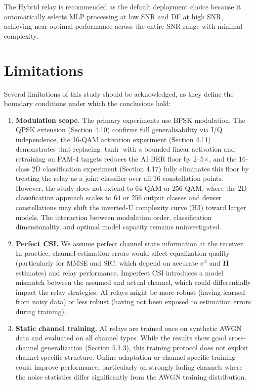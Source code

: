 \documentclass[
  english,
  12pt,
  12pt,
  a4paper,
  oneside]{report}
\begin{document}
The Hybrid relay is recommended as the default deployment choice because it automatically selects MLP processing at low SNR and DF at high SNR, achieving near-optimal performance across the entire SNR range with minimal complexity.

\section{Limitations}\label{sec:limitations}

Several limitations of this study should be acknowledged, as they define the boundary conditions under which the conclusions hold:

\begin{enumerate}
\def\labelenumi{\arabic{enumi}.}
\item
  \textbf{Modulation scope.} The primary experiments use BPSK modulation. The QPSK extension (Section 4.10) confirms full generalisability via I/Q independence, the 16-QAM activation experiment (Section 4.11) demonstrates that replacing \(\tanh\) with a bounded linear activation and retraining on PAM-4 targets reduces the AI BER floor by 2--5×, and the 16-class 2D classification experiment (Section 4.17) fully eliminates this floor by treating the relay as a joint classifier over all 16 constellation points. However, the study does not extend to 64-QAM or 256-QAM, where the 2D classification approach scales to 64 or 256 output classes and denser constellations may shift the inverted-U complexity curve (H3) toward larger models. The interaction between modulation order, classification dimensionality, and optimal model capacity remains uninvestigated.
\item
  \textbf{Perfect CSI.} We assume perfect channel state information at the receiver. In practice, channel estimation errors would affect equalization quality (particularly for MMSE and SIC, which depend on accurate \(\sigma^2\) and \(\mathbf{H}\) estimates) and relay performance. Imperfect CSI introduces a model mismatch between the assumed and actual channel, which could differentially impact the relay strategies: AI relays might be more robust (having learned from noisy data) or less robust (having not been exposed to estimation errors during training).
\item
  \textbf{Static channel training.} AI relays are trained once on synthetic AWGN data and evaluated on all channel types. While the results show good cross-channel generalization (Section 5.1.3), this training protocol does not exploit channel-specific structure. Online adaptation or channel-specific training could improve performance, particularly on strongly fading channels where the noise statistics differ significantly from the AWGN training distribution.

\end{enumerate}
\end{document}
